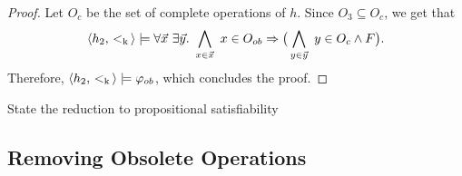 \begin{proof}
Let $O_c$ be the set of complete operations of $h$. Since $O_3\subseteq O_c$, we get that
\[
\left\langle {h_2,{ \,<_{\rm k}\, }} \right\rangle\models 
\forall \vec{x}\ \exists \vec{y}.\ \bigwedge_{x\in\vec{x}}\ x\in O_{ob} => \big(\bigwedge_{y\in\vec{y}}\ y\in O_c \land F\big).
\]
Therefore, $\left\langle {h_2,{ \,<_{\rm k}\, }} \right\rangle\models \varphi_{ob}$, which concludes the proof.
\end{proof}


\begin{corollary}\label{cor:satisfiability}

State the reduction to propositional satisfiability

\end{corollary}

\subsection{Removing Obsolete Operations}

















